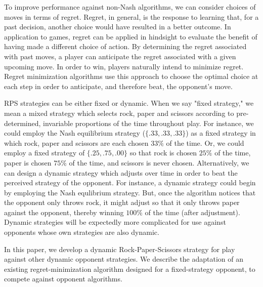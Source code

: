 To improve performance against non-Nash algorithms, we can consider choices of moves in terms of regret.  Regret, in general, is the response to learning that, for a past decision, another choice would have resulted in a better outcome.  In application to games, regret can be applied in hindsight to evaluate the benefit of having made a different choice of action.  By determining the regret associated with past moves, a player can anticipate the regret associated with a given upcoming move.  In order to win, players naturally intend to minimize regret.  Regret minimization algorithms use this approach to choose the optimal choice at each step in order to anticipate, and therefore beat, the opponent's move.

RPS strategies can be either fixed or dynamic. When we say "fixed strategy," we mean a mixed strategy which selects rock, paper and scissors according to pre-determined, invariable proportions of the time throughout play. For instance, we could employ the Nash equilibrium strategy ($\{ .33, .33, .33 \}$) as a fixed strategy in which rock, paper and scissors are each chosen $33\%$ of the time. Or, we could employ a fixed strategy of $\{ .25, .75, .00 \}$ so that rock is chosen $25\%$ of the time, paper is chosen $75\%$ of the time, and scissors is never chosen. Alternatively, we can design a dynamic strategy which adjusts over time in order to beat the perceived strategy of the opponent. For instance, a dynamic strategy could begin by employing the Nash equlibrium strategy. But, once the algorithm notices that the opponent only throws rock, it might adjust so that it only throws paper against the opponent, thereby winning $100\%$ of the time (after adjustment). Dynamic strategies will be expectedly more complicated for use against opponents whose own strategies are also dynamic.

In this paper, we develop a dynamic Rock-Paper-Scissors strategy for play against other dynamic opponent strategies. We describe the adaptation of an existing regret-minimization algorithm designed for a fixed-strategy opponent, to compete against opponent algorithms.




